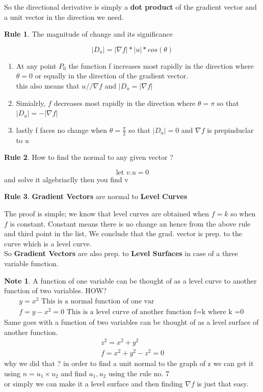 \documentclass[11pt]{article}
\theoremstyle{definition}
\newtheorem{reg}{Rule}
\newtheorem{note}{Note}
\begin{document}
So the directional derivative is simply a\textbf{ dot product} of the gradient vector and a unit vector in the direction we need.\\
\begin{reg}
The magnitude of change and its significance 
\end{reg}
\begin{equation}
	|D_u| = |\nabla f| * |u| * cos(\theta)
\end{equation}
\begin{enumerate}

\item At any point $P_0$ the function f increases most rapidly in the direction where $\theta = 0$ or equally in the direction of the gradient vector.
\\ this also means that $u // \nabla f$ and $|D_u=|\nabla f |$
\item Simialrly, $f$ decreases most rapidly in the direction where $\theta = \pi$ so that $|D_u| = -|\nabla f|$
\item lastly f faces no change when $\theta = \frac{\pi}{2}$ so that $|D_u| = 0$ and $\nabla f$ is prepinduclar to $u$
\end{enumerate}
\begin{reg}
	How to find the normal to any given vector ?
\end{reg}
\begin{equation}
	\text{let }   v.u =0
\end{equation}
and solve it algebriaclly then you find v
\begin{reg}
\textbf{Gradient Vectors} are normal to \textbf{Level Curves}
\end{reg}
The proof is simple; we know that level curves are obtained when $f=k$ so when $f$ is constant. Constant means there is no change an hence from the above rule and third point in the list, We conclude that the grad. vector is prep. to the curve which is a level curve.\\
So \textbf{Gradient Vectors} are also prep. to \textbf{Level Surfaces} in case of a three variable function.
\begin{note}
A function of one variable can be thought of as a level curve to another function of two variables. HOW? \\
\begin{align}
	y = x^2 \text{  This is a normal function of one var} \\
	f= y-x^2 = 0 \text{  This is a level curve of another function f=k where k =0 }
\end{align}
Same goes with a function of two variables can be thought of as a level surface of another function.
\begin{align}
z^2 = x^2 + y^2 \\
f = x^2 + y^2 - z^2=0
\end{align}
why we did that ? 
in order to find a unit normal to the graph of z we can get it using $n=u_1 \times u_2$ and find $u_1, u_2$ using the rule no. 7 \\
or simply we can make it a level surface and then finding $\nabla f$ is just that easy.
\end{note}
\end{document}
